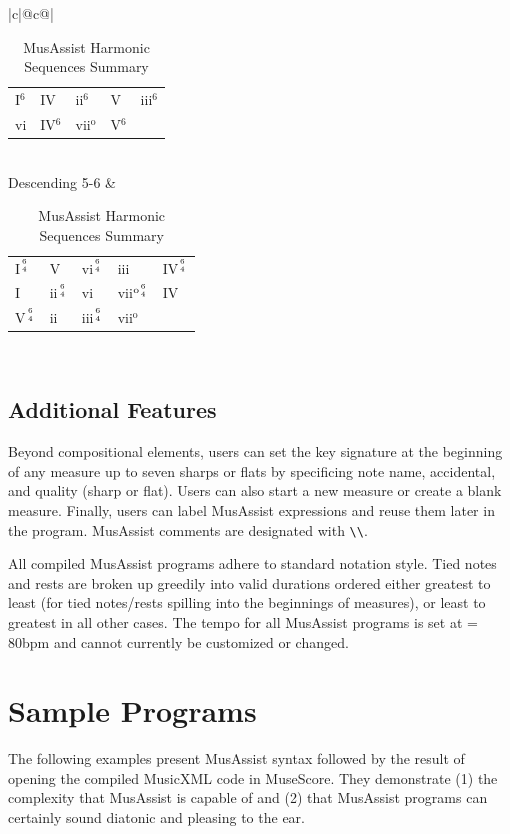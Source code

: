 \documentclass{article}
\newlength{\maxcollen}
\begin{document}
\begin{table}[h!]
\begin{center}
{\begin{tabular}{|c|@{}c@{}|}
\begin{tabular}{p{\maxcollen}p{\maxcollen}p{\maxcollen}p{\maxcollen}p{\maxcollen}}
                      I$^6$ & IV     & ii$^6$          & V                 & iii$^6$  \\ \hdashline 
                      vi    & IV$^6$ & vii$^\text{o}$  & V$^6$           
                    \end{tabular} \\ \hline
  Descending 5-6    & \renewcommand{\arraystretch}{1.5}
                    \begin{tabular}{p{\maxcollen}p{\maxcollen}p{\maxcollen}p{\maxcollen}p{\maxcollen}} 
                      I$^{6 \atop 4}$ & V                & vi$^{6 \atop 4}$ & iii                         & IV$^{6 \atop 4}$ \\ \hdashline 
                      I               & ii$^{6 \atop 4}$ & vi               & vii$^{\text{o}{6 \atop 4}}$ & IV               \\ \hdashline 
                      V$^{6 \atop 4}$  & ii               & iii$^{6 \atop 4}$           & vii$^\text{o}$  
                    \end{tabular} \\ \hline
  \end{tabular}
  }
  
  \caption{MusAssist Harmonic Sequences Summary\label{table:harmseq}}
\end{center}
\end{table}

\vspace{-8mm}
\subsection{Additional Features}
Beyond compositional elements, users can set the key signature at the beginning
of any measure up to seven sharps or flats by specificing note name, accidental, and quality (sharp or flat).
Users can also start a new measure or create a blank measure. Finally,
users can label MusAssist expressions and reuse them later in the program. MusAssist
comments are designated with \verb!\\!.

All compiled MusAssist programs adhere to standard notation style. Tied notes and rests 
are broken up greedily into valid durations ordered either greatest to least (for tied
notes/rests spilling into the beginnings of measures), or least to greatest in all
other cases. The tempo for all MusAssist programs
is set at \musQuarter\;= 80bpm and cannot currently be customized or changed.

\section{Sample Programs}
The following examples present MusAssist syntax followed by the result of
 opening the compiled MusicXML code in MuseScore. 
They demonstrate (1) the complexity that MusAssist is capable of and (2) 
that MusAssist programs can certainly sound diatonic and pleasing to the ear.
\end{document}
